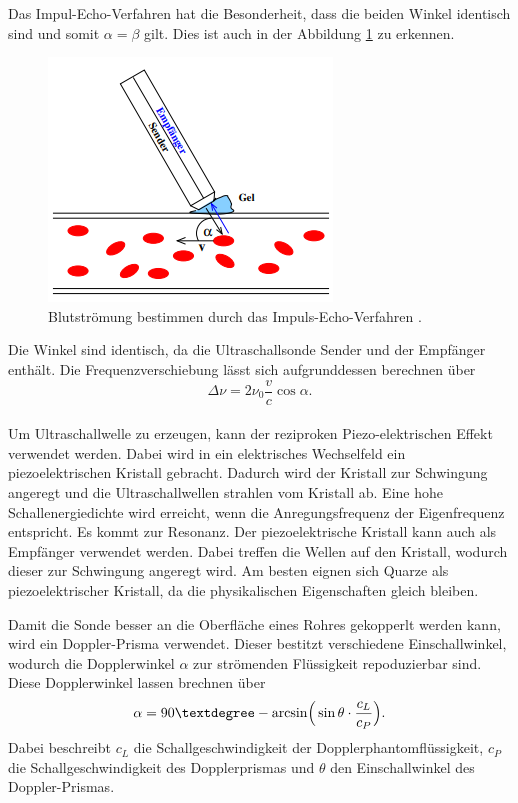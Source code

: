 Das Impul-Echo-Verfahren hat die Besonderheit, dass die beiden Winkel identisch sind und somit $\alpha = \beta$ gilt.
Dies ist auch in der Abbildung \ref{fig:IEV} zu erkennen.
\begin{figure}[H]
    \centering
    \includegraphics[scale=0.5]{content/TheoBild.png}
    \caption{Blutströmung bestimmen durch das Impuls-Echo-Verfahren \cite{sample}.}
    \label{fig:IEV}
\end{figure}
\noindent Die Winkel sind identisch, da die Ultraschallsonde Sender und der Empfänger enthält.
Die Frequenzverschiebung lässt sich aufgrunddessen berechnen über
\begin{equation}
    \Delta \nu = 2 \nu_0 \frac{v}{c} \cos \alpha.
    \label{eq:deltaf}
\end{equation}
\\

\noindent Um Ultraschallwelle zu erzeugen, kann der reziproken Piezo-elektrischen Effekt verwendet werden.
Dabei wird in ein elektrisches Wechselfeld ein piezoelektrischen Kristall gebracht.
Dadurch wird der Kristall zur Schwingung angeregt und die Ultraschallwellen strahlen vom Kristall ab.
Eine hohe Schallenergiedichte wird erreicht, wenn die Anregungsfrequenz der Eigenfrequenz entspricht.
Es kommt zur Resonanz.
Der piezoelektrische Kristall kann auch als Empfänger verwendet werden.
Dabei treffen die Wellen auf den Kristall, wodurch dieser zur Schwingung angeregt wird.
Am besten eignen sich Quarze als piezoelektrischer Kristall, da die physikalischen Eigenschaften gleich bleiben.

\noindent Damit die Sonde besser an die Oberfläche eines Rohres gekopperlt werden kann, wird ein Doppler-Prisma verwendet.
Dieser bestitzt verschiedene Einschallwinkel, wodurch die Dopplerwinkel $\alpha$ zur strömenden Flüssigkeit repoduzierbar sind.
Diese Dopplerwinkel lassen brechnen über
\begin{equation}
    \alpha = 90° - \arcsin \Bigr( \sin \theta \cdot \frac{c_L}{c_P}\Bigl).
    \label{eq:alp}
\end{equation}
Dabei beschreibt $c_L$ die Schallgeschwindigkeit der Dopplerphantomflüssigkeit, $c_P$ die Schallgeschwindigkeit des Dopplerprismas
und $\theta$ den Einschallwinkel des Doppler-Prismas.

\cite{sample}
